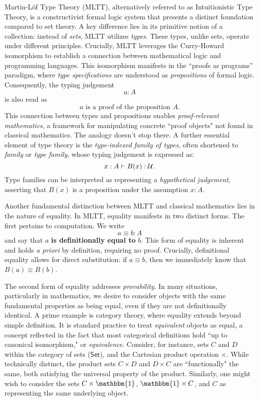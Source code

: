 \documentclass[main.tex]{subfiles}
\begin{document}
Martin-Löf Type Theory (MLTT), alternatively referred to as Intuitionistic Type Theory, is a constructivist formal logic system that presents a distinct foundation compared to set theory. A key difference lies in its primitive notion of a collection: instead of \textit{sets}, MLTT utilizes \textit{types}. These types, unlike sets, operate under different principles. Crucially, MLTT leverages the Curry-Howard isomorphism to establish a connection between mathematical logic and programming languages. This isomorphism manifests in the ``proofs as programs'' paradigm, where \textit{type specifications} are understood as \textit{propositions} of formal logic. Consequently, the typing judgement
\[ a : A \]
is also read as
\[
a \text{ is a proof of the proposition } A.
\]
This connection between types and propositions enables \textit{proof-relevant mathematics}, a framework for manipulating concrete ``proof objects" not found in classical mathematics. The analogy doesn't stop there. A further essential element of type theory is the \textit{type-indexed family of types}, often shortened to \textit{family} or \textit{type family}, whose typing judgement is expressed as:
\[
x : A \vdash B (x) : \mathcal{U}.
\]
Type families can be interpreted as representing a \textit{hypothetical judgement}, asserting that $B(x)$ is a proposition under the assumption $x:A$.

Another fundamental distinction between MLTT and classical mathematics lies in the nature of equality. In MLTT, equality manifests in two distinct forms. The first pertains to computation. We write \[ a \equiv b : A\] and say that $a$ \textbf{is definitionally equal to} $b$. This form of equality is inherent and holds \textit{a priori} by definition, requiring no proof. Crucially, definitional equality allows for direct substitution: if $a \equiv b$, then we immediately know that $B(a) \equiv B(b)$.

The second form of equality addresses \textit{provability}. In many situations, particularly in mathematics, we desire to consider objects with the same fundamental properties as being equal, even if they are not definitionally identical. A prime example is category theory, where equality extends beyond simple definition. It is standard practice to treat \textit{equivalent} objects as equal, a concept reflected in the fact that most categorical definitions hold ``up to canonical isomorphism," or \textit{equivalence}. Consider, for instance, sets $C$ and $D$ within the category of sets ($\mathsf{Set}$), and the Cartesian product operation $\times$. While technically distinct, the product sets $C \times D$ and $D \times C$ are ``functionally" the same, both satisfying the universal property of the product. Similarly, one might wish to consider the sets $C \times \mathbbm{1}$, $\mathbbm{1} \times C$, and $C$ as representing the same underlying object.
\end{document}
